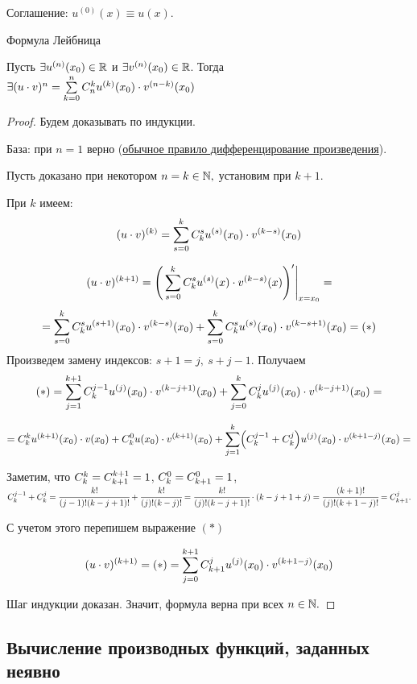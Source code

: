 Соглашение: $u^{(0)}(x) \equiv u(x)$.

\begin{theorem} \hypertarget{thrm5.8}{Формула Лейбница}
	Пусть $\exists u^{(n)}(x_{0}) \in \mathbb{R} $ и $\exists v^{(n)}(x_{0}) \in \mathbb{R}$. Тогда $\exists (u\cdot v)^{n} = \sum\limits_{k=0}^{n} \relax C_{n}^{k} u^{(k)}(x_{0}) \cdot v^{(n-k)}(x_{0})$
\end{theorem}
\begin{proof}
	Будем доказывать по индукции.
	
	База: при $n =1 $ верно (\hyperlink{thrm5.3}{обычное правило дифференцирование произведения}).
	
	Пусть доказано при некотором $n = k \in \mathbb{N},$ установим при $k + 1$.
	
	При $k$ имеем:
	$$(u \cdot v)^{(k)} = \sum\limits_{s=0}^{k} \relax C_{k}^{s} u^{(s)}(x_{0}) \cdot v^{(k-s)}(x_{0}) $$
	
	$$
	(u \cdot v)^{(k+1)} = \Bigg(\sum\limits_{s=0}^{k} \relax C_{k}^{s} u^{(s)}(x) \cdot v^{(k-s)}(x) \Bigg)' \Bigg|_{x=x_{0}} = 
	$$
	$$ =\sum\limits_{s=0}^{k} \relax C_{k}^{s} u^{(s+1)}(x_{0}) \cdot v^{(k-s)}(x_{0}) + \sum\limits_{s=0}^{k} \relax C_{k}^{s} u^{(s)}(x_{0}) \cdot v^{(k-s + 1)}(x_{0}) = (*)
	$$
	Произведем замену индексов: $ s + 1 = j, \ s+ j - 1$. Получаем
	$$
	(*) = \sum\limits_{j=1}^{k+1} \relax C_{k}^{j-1} u^{(j)}(x_{0}) \cdot v^{(k-j + 1)}(x_{0}) + \sum\limits_{j=0}^{k} \relax C_{k}^{j} u^{(j)}(x_{0}) \cdot v^{(k-j + 1)}(x_{0}) =
	$$
	
	$$
	=  \relax C_{k}^{k} u^{(k+1)}(x_{0}) \cdot v(x_{0}) + \relax C_{k}^{0} u(x_{0}) \cdot v^{(k+ 1)}(x_{0}) + \sum\limits_{j=1}^{k} \Bigl(\relax C_{k}^{j-1} + \relax C_{k}^{j} \Bigr) u^{(j)}(x_{0}) \cdot v^{(k+1 -j)}(x_{0}) = 
	$$
	
	Заметим, что $\relax C_{k}^{k} = \relax C_{k+1}^{k+1} = 1$, $\relax C_{k}^{0} = \relax C_{k + 1}^{0} = 1$, $
	\relax C_{k}^{j-1} +  \relax C_{k}^{j} = \cfrac{k!}{(j-1)!(k-j + 1)!} + \cfrac{k!}{(j)!(k-j)!} = \cfrac{k!}{(j)!(k-j+1)!} \cdot ( k -j + 1 + j) = \cfrac{(k+1)!}{(j)!(k+1-j)!} = C_{k+1}^{j}.$
	
	С учетом этого перепишем выражение $(*)$
	
	$$
	(u \cdot v)^{(k+1)} = (*) = \sum\limits_{j=0}^{k+1} \relax C_{k+1}^{j} u^{(j)}(x_{0}) \cdot v^{(k+1-j)}(x_{0})
	$$
	
	Шаг индукции доказан. Значит, формула верна при всех $n \in \mathbb{N}.$
\end{proof}

\subsection{Вычисление производных функций, заданных неявно}

